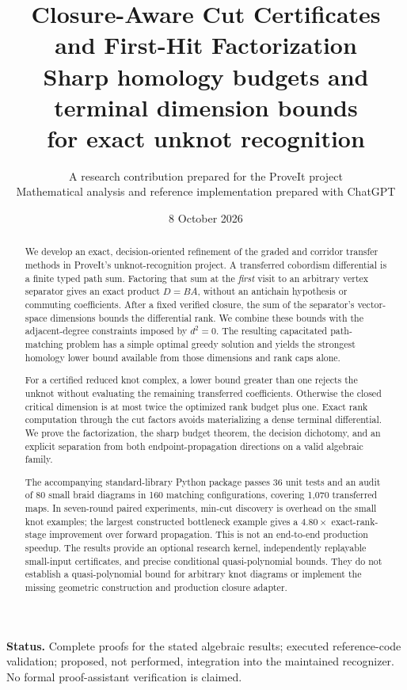 \documentclass[11pt,letterpaper]{article}
\title{\textbf{Closure-Aware Cut Certificates\protect\\and First-Hit Factorization}\\[5pt]
\large Sharp homology budgets and terminal dimension bounds\protect\\
for exact unknot recognition}
\author{A research contribution prepared for the ProveIt project\\
\small Mathematical analysis and reference implementation prepared with ChatGPT}
\date{8 October 2026}
\theoremstyle{definition}\newtheorem{definition}[theorem]{Definition}
\theoremstyle{remark}\newtheorem{remark}[theorem]{Remark}
\begin{document}
\maketitle
\begin{abstract}
We develop an exact, decision-oriented refinement of the graded and corridor
transfer methods in ProveIt's unknot-recognition project. A transferred
cobordism differential is a finite typed path sum. Factoring that sum at the
\emph{first} visit to an arbitrary vertex separator gives an exact product
$D=BA$, without an antichain hypothesis or commuting coefficients. After a
fixed verified closure, the sum of the separator's vector-space dimensions
bounds the differential rank. We combine these bounds with the adjacent-degree
constraints imposed by $d^2=0$. The resulting capacitated path-matching problem
has a simple optimal greedy solution and yields the strongest homology lower
bound available from those dimensions and rank caps alone.

For a certified reduced knot complex, a lower bound greater than one rejects
the unknot without evaluating the remaining transferred coefficients.
Otherwise the closed critical dimension is at most twice the optimized rank
budget plus one. Exact rank computation through the cut factors avoids
materializing a dense terminal differential. We prove the factorization,
the sharp budget theorem, the decision dichotomy, and an explicit separation
from both endpoint-propagation directions on a valid algebraic family.

The accompanying standard-library Python package passes 36 unit tests and an
audit of 80 small braid diagrams in 160 matching configurations, covering
1,070 transferred maps. In seven-round paired experiments, min-cut discovery
is overhead on the small knot examples; the largest constructed bottleneck
example gives a $4.80\times$ exact-rank-stage improvement over forward
propagation. This is not an end-to-end production speedup. The results provide
an optional research kernel, independently replayable small-input certificates,
and precise conditional quasi-polynomial bounds. They do not establish a
quasi-polynomial bound for arbitrary knot diagrams or implement the missing
geometric construction and production closure adapter.
\end{abstract}
\vspace{4pt}
\noindent\textbf{Status.} Complete proofs for the stated algebraic results;
executed reference-code validation; proposed, not performed, integration into
the maintained recognizer. No formal proof-assistant verification is claimed.
\newpage
\tableofcontents
\newpage
\end{document}
